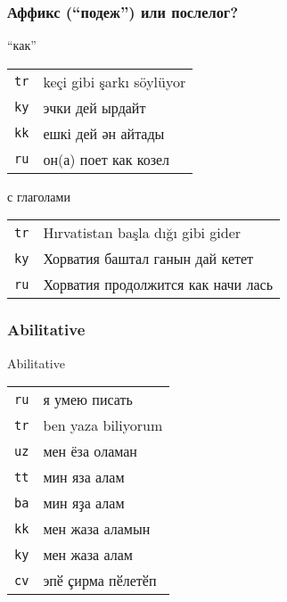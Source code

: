 \documentclass[10pt,xetex]{beamer} %
\begin{document}
\begin{frame}
	\frametitle{Аффикс (``подеж'') или послелог?}
	\begin{block}{``как''}
		\begin{tabular}{ll}
			\texttt{tr} & {\color{green} keçi} {\color{blue} gibi} şarkı söylüyor \\
			\texttt{ky} & {\color{green} эчки}{\color{blue} дей} ырдайт \\
			\texttt{kk} & {\color{green} ешкі}{\color{blue} дей} ән айтады \\
			\texttt{ru} & он(а) поет {\color{blue} как} {\color{green} козел} \\
		\end{tabular}
	\end{block}

	\begin{block}{с глаголами}
		\begin{tabular}{ll}
			\texttt{tr} & Hırvatistan başla{\color{green} dığ}ı {\color{blue} gibi} gider \\
			\texttt{ky} & Хорватия баштал{\color{green} ган}ын{\color{blue} дай} кетет \\
			\texttt{ru} & Хорватия продолжится {\color{blue} как} начи{\color{green} ла}сь \\
		\end{tabular}
	\end{block}
\end{frame}

\begin{frame}
	\frametitle{Abilitative}
	\begin{block}{Abilitative}
		\begin{tabular}{ll}
			\texttt{ru} & я {\color{blue} уме}ю {\color{green} пис}ать \\
			\texttt{tr} & ben {\color{green} yaz}a{\color{blue} bil}iyorum \\
			\texttt{uz} & мен {\color{green} ёз}а {\color{blue} ол}аман \\
			\texttt{tt} & мин {\color{green} яз}а {\color{blue} ал}ам \\
			\texttt{ba} & мин {\color{green} яҙ}а {\color{blue} ал}ам \\ 
			\texttt{kk} & мен {\color{green} жаз}а {\color{blue} ал}амын \\
			\texttt{ky} & мен {\color{green} жаз}а {\color{blue} ал}ам \\
			\texttt{cv} & эпӗ {\color{green} ҫир}ма {\color{blue} пӗл}етӗп \\
		\end{tabular}
	\end{block}
\end{frame}
\end{document}
